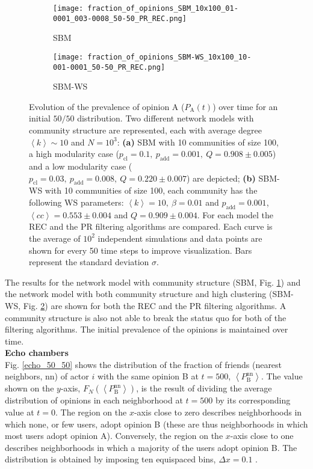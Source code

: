 \documentclass[11 pt , letterpaper , twoside , openright]{book}
\begin{document}
\begin{figure}[H]
  \begin{subfigure}[b]{0.49\textwidth}
    \caption{SBM}
    \texttt{[image: fraction\_of\_opinions\_SBM\_10x100\_01-0001\_003-0008\_50-50\_PR\_REC.png]}
    \label{sbm_50-50}
  \end{subfigure}
  \begin{subfigure}[b]{0.49\textwidth}
    \caption{SBM-WS}
    \texttt{[image: fraction\_of\_opinions\_SBM-WS\_10x100\_10-001-0001\_50-50\_PR\_REC.png]}
    \label{sbm-ws_50-50}
  \end{subfigure}
  \captionsetup{format=plain}
  \caption[Evolution of the prevalence of opinion A ($P_{\text{A}}(t)$) over time for an initial $50/50$ opinion distribution.]{Evolution of the prevalence of opinion A ($P_{\text{A}}(t)$) over time for an initial $50/50$ distribution. Two different network models with community structure are represented, each with average degree $\left<k\right> \sim 10$ and $N = 10^3$: \textbf{(a)} SBM with 10 communities of size 100, a high modularity case ($p_{\text{cl}} = 0.1,\ p_{\text{add}} = 0.001,\ Q = 0.908 \pm 0.005$) and a low modularity case ($p_{\text{cl}} = 0.03,\ p_{\text{add}} = 0.008,\ Q = 0.220 \pm 0.007$) are depicted; \textbf{(b)} SBM-WS with 10 communities of size 100, each community has the following WS parameters: $\left<k\right> = 10,\ \beta = 0.01$ and $p_{\text{add}} = 0.001$, $\left<cc\right> = 0.553 \pm 0.004$ and $Q = 0.909 \pm 0.004$. For each model the REC and the PR filtering algorithms are compared. Each curve is the average of $10^2$ independent simulations and data points are shown for every 50 time steps to improve visualization. Bars represent the standard deviation $\sigma$.}
\label{ev_op_50_50}
\end{figure}
\noindent
The results for the network model with community structure (SBM, Fig. \ref{sbm_50-50}) and the network model with both community structure and high clustering (SBM-WS, Fig. \ref{sbm-ws_50-50}) are shown for both the REC and the PR filtering algorithms. A community structure is also not able to break the status quo for both of the filtering algorithms. The initial prevalence of the opinions is maintained over time.\\
\newline
\textbf{Echo chambers}\\
\newline
Fig. \ref{echo_50_50} shows the distribution of the fraction of friends (nearest neighbors, nn) of actor $i$ with the same opinion B at $t=500$, $\left<P_{\text{B}}^{\text{nn}}\right>$. The value shown on the $y$-axis, $F_N(\left<P_{\text{B}}^{\text{nn}}\right>)$, is the result of dividing the average distribution of opinions in each neighborhood at $t=500$ by its corresponding value at $t=0$. The region on the $x$-axis close to zero describes neighborhoods in which none, or few users, adopt opinion B (these are thus neighborhoods in which most users adopt opinion A). Conversely, the region on the $x$-axis close to one describes neighborhoods in which a majority of the users adopt opinion B. The distribution is obtained by imposing ten equispaced bins, $\Delta x = 0.1$ \cite{Perra2019}. 
\end{document}
